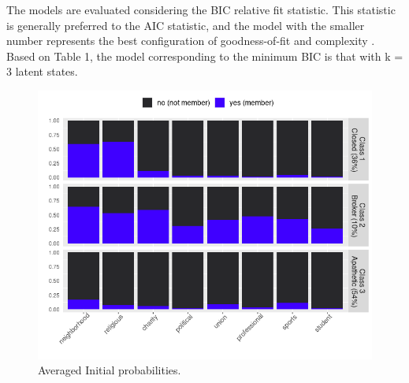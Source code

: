 The models are evaluated considering the BIC relative fit statistic. This statistic is generally preferred to the AIC statistic, and the model with the smaller number represents the best configuration of goodness-of-fit and complexity \parencite{bartolucci_latent_2015}. Based on Table 1, the model corresponding to the minimum BIC is that with k = 3 latent states. 

\begin{figure}[H]
    \centering
    \includegraphics[width=12cm]{output/plot_latentclass2.png}
    \caption{Averaged Initial probabilities.}
    \label{fig:}
\end{figure}


